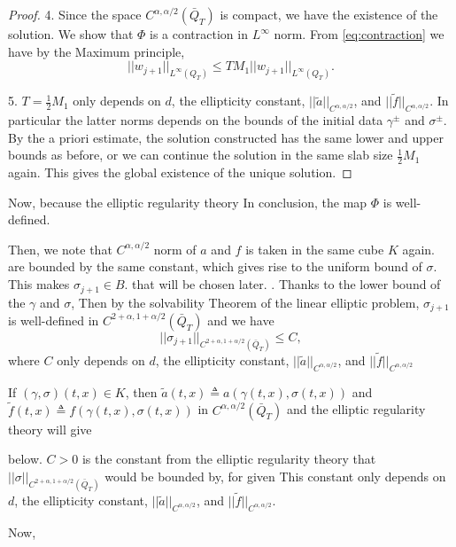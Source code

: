 \documentclass[a4paper,11pt]{article}
\def\blue{\color{blue}}
\theoremstyle{remark}
\begin{document}
\begin{proof}
4. Since the space $C^{\alpha,\alpha/2}(\bar{Q}_T)$ is compact, we have the existence of the solution. We show that $\Phi$ is a contraction in $L^\infty$ norm. From \eqref{eq:contraction} we have by the Maximum principle,
$$||w_{j+1}||_{L^\infty(Q_T)} \le T M_1||w_{j+1}||_{L^\infty(Q_T)}.$$

5. $T= \frac{1}{2} M_1$ only depends on $d$, the ellipticity constant, $||\tilde a||_{C^{\alpha,\alpha/2}}$, and $||\tilde f||_{C^{\alpha,\alpha/2}}$. In particular the latter norms depends on the bounds of the initial data $\gamma^\pm$ and $\sigma^\pm$. By the a priori estimate, the solution constructed has the same lower and upper bounds as before, or we can continue the solution in the same slab size $\frac{1}{2} M_1$ again. This gives the global existence of the unique solution.
\end{proof}

Now, because the elliptic regularity theory In conclusion, the map $\Phi$ is well-defined.



Then, we note that $C^{\alpha,\alpha/2}$ norm of $a$ and $f$ is taken in the same cube $K$ again. are bounded by the same constant, which gives rise to the uniform bound of $\sigma$. This makes $\sigma_{j+1} \in B$.
that will be chosen later. . Thanks to the lower bound of the $\gamma$ and $\sigma$,  Then by {\blue the solvability Theorem} of the linear elliptic problem, $\sigma_{j+1}$ is well-defined in $C^{2+\alpha,1+\alpha/2}(\bar{Q}_T)$ and we have $$||\sigma_{j+1}||_{C^{2+\alpha,1+\alpha/2}(\bar{Q}_T)} \le C,$$ where $C$ only depends on $d$, the ellipticity constant, $||\tilde a||_{C^{\alpha,\alpha/2}}$, and $||\tilde f||_{C^{\alpha,\alpha/2}}$ 

If $(\gamma,\sigma)(t,x) \in K$, then $\tilde a(t,x)\triangleq a(\gamma(t,x),\sigma(t,x))$ and $\tilde f(t,x)\triangleq f(\gamma(t,x),\sigma(t,x))$ in $C^{\alpha,\alpha/2}(\bar{Q}_T)$ and the elliptic regularity theory will give


below. $C>0$ is the constant from the elliptic regularity theory that $||\sigma||_{C^{2+\alpha,1+\alpha/2}(\bar{Q}_T)}$ would be bounded by, for given  This constant only depends on $d$, the ellipticity constant, $||\tilde a||_{C^{\alpha,\alpha/2}}$, and $||\tilde f||_{C^{\alpha,\alpha/2}}$. 



Now, 






\pagebreak
\end{document}
